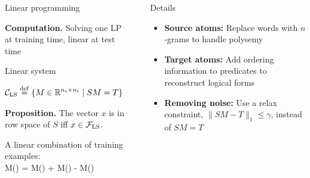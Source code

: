 \documentclass[final,table]{beamer}
\newlength{\sepwid}
\newlength{\onecolwid}
\begin{document}
\begin{frame}[t]
\begin{columns}[t]
\begin{column}{\onecolwid}
\begin{block}{Linear programming}

{\bf Computation. } Solving one LP at training time, linear at test time
\end{block}

\begin{block}{Linear system}

\begin{align*}
\mathcal{C}_\text{\rm LS} &\stackrel{\rm def}{=} \{ M \in \mathbb{R}^{n_\text{s} \times n_\text{t}} \mid S M = T \}
\end{align*}

{\bf Proposition.}  The vector $x$ is in row space of $S$ iff $x \in \mathcal{F}_\text{\rm LS}$.
	


A linear combination of training examples:\\
\centering
 {\scriptsize M() = M() + M() - M()}


\end{block}


%




\end{column} %



\begin{column}{\sepwid}\end{column} %

\begin{column}{\onecolwid} %

\begin{block}{Details}
\begin{itemize}
\item {\bf Source atoms:} Replace words with $n$-grams to handle polysemy
\item {\bf Target atoms:} Add ordering information to predicates to reconstruct logical forms
\item {\bf Removing noise:} Use a relax constraint, $\|SM-T\|_1 \le \gamma$, instead of $SM=T$
\end{itemize}
\end{block}


\end{column}
\end{columns}
\end{frame}
\end{document}

